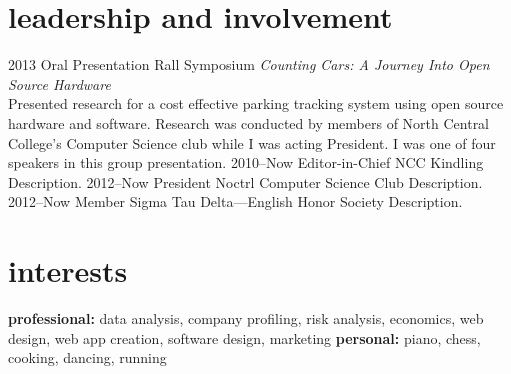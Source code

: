 \documentclass[]{friggeri-cv} %
\begin{document}

\section{leadership and involvement}

\begin{entrylist}
\entry
{2013}
{Oral Presentation}
{Rall Symposium}
{\emph{Counting Cars: A Journey Into Open Source Hardware}\\
Presented research for a cost effective parking tracking system using open source hardware and software.
Research was conducted by members of North Central College's Computer Science club while I was acting President. I was one of four speakers in this group presentation.}
\entry
{2010--Now}
{Editor-in-Chief}
{NCC Kindling}
{Description.}
\entry
{2012--Now}
{President}
{Noctrl Computer Science Club}
{Description.}
\entry
{2012--Now}
{Member}
{Sigma Tau Delta---English Honor Society}
{Description.}
\end{entrylist}


\section{interests}

\textbf{professional:} data analysis, company profiling, risk analysis, economics, web design, web app creation, software design, marketing \textbf{personal:} piano, chess, cooking, dancing, running
\end{document}
